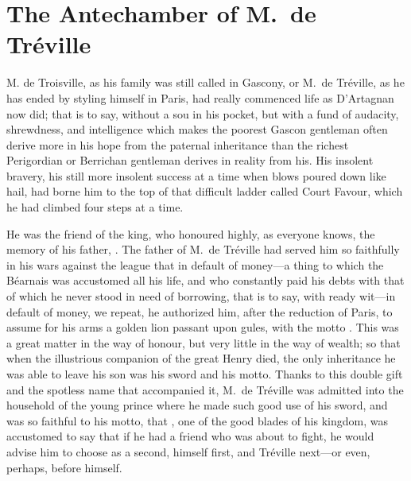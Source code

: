
\chapter{The Antechamber of M.~de Tréville} 
	
	\lettrine{M}{.} de Troisville, as his family was still called in Gascony, or M.~de Tréville, as he has ended by styling himself in Paris, had really commenced life as D'Artagnan now did; that is to say, without a sou in his pocket, but with a fund of audacity, shrewdness, and intelligence which makes the poorest Gascon gentleman often derive more in his hope from the paternal inheritance than the richest Perigordian or Berrichan gentleman derives in reality from his. His insolent bravery, his still more insolent success at a time when blows poured down like hail, had borne him to the top of that difficult ladder called Court Favour, which he had climbed four steps at a time. 

He was the friend of the king, who honoured highly, as everyone knows, the memory of his father, . The father of M.~de Tréville had served him so faithfully in his wars against the league that in default of money—a thing to which the Béarnais was accustomed all his life, and who constantly paid his debts with that of which he never stood in need of borrowing, that is to say, with ready wit—in default of money, we repeat, he authorized him, after the reduction of Paris, to assume for his arms a golden lion passant upon gules, with the motto . This was a great matter in the way of honour, but very little in the way of wealth; so that when the illustrious companion of the great Henry died, the only inheritance he was able to leave his son was his sword and his motto. Thanks to this double gift and the spotless name that accompanied it, M.~de Tréville was admitted into the household of the young prince where he made such good use of his sword, and was so faithful to his motto, that , one of the good blades of his kingdom, was accustomed to say that if he had a friend who was about to fight, he would advise him to choose as a second, himself first, and Tréville next—or even, perhaps, before himself. 

